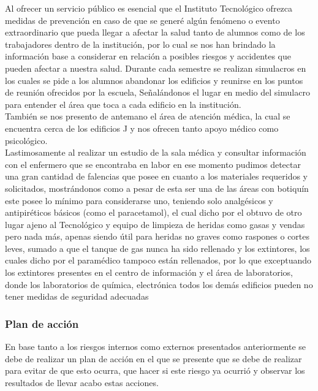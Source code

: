 Al ofrecer un servicio público es esencial que el Instituto Tecnológico ofrezca medidas de prevención en caso de que se generé algún fenómeno o evento extraordinario que pueda llegar a afectar la salud tanto de alumnos como de los trabajadores dentro de la institución, por lo cual se nos han brindado la información base a considerar en relación a posibles riesgos y accidentes que pueden afectar a nuestra salud.
Durante cada semestre se realizan simulacros en los cuales se pide a los alumnos abandonar los edificios y reunirse en los puntos de reunión ofrecidos por la escuela, Señalándonos el lugar en medio del simulacro para entender el área que toca a cada edificio en la institución.
\\También se nos presento de antemano el área de atención médica, la cual se encuentra cerca de los edificios J y nos ofrecen tanto apoyo médico como psicológico.
 \\Lastimosamente al realizar un estudio de la sala médica y consultar información con el enfermero que se encontraba en labor en ese momento pudimos detectar una gran cantidad de falencias que posee en cuanto a los materiales requeridos y solicitados, mostrándonos como a pesar de esta ser una de las áreas con botiquín este posee lo mínimo para considerarse uno, teniendo solo analgésicos y antipiréticos básicos (como el paracetamol), el cual dicho por el obtuvo de otro lugar ajeno al Tecnológico y equipo de limpieza de heridas como gasas y vendas pero nada más, apenas siendo útil para heridas no graves como raspones o cortes leves, sumado a que el tanque de gas nunca ha sido rellenado y los extintores, los cuales  dicho por el paramédico tampoco están rellenados, por lo que exceptuando los extintores presentes en el centro de información y el área de laboratorios, donde los laboratorios de química, electrónica todos los demás edificios pueden no tener medidas de seguridad adecuadas

 \subsubsection{Plan de acción}

 En base tanto a los riesgos internos como externos presentados anteriormente se debe de realizar un plan de acción en el que se presente que se debe de realizar para evitar de que esto ocurra, que hacer si este riesgo ya ocurrió y observar los resultados de llevar acabo estas acciones.

